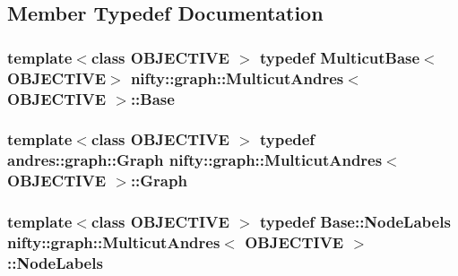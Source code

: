 \subsection{Member Typedef Documentation}
\hypertarget{classnifty_1_1graph_1_1MulticutAndres_a69c11222fd83a2839aad9a67ced87c87}{}
\subsubsection[{Base}]{\setlength{\rightskip}{0pt plus 5cm}template$<$class O\+B\+J\+E\+C\+T\+I\+V\+E $>$ typedef {\bf Multicut\+Base}$<$O\+B\+J\+E\+C\+T\+I\+V\+E$>$ {\bf nifty\+::graph\+::\+Multicut\+Andres}$<$ O\+B\+J\+E\+C\+T\+I\+V\+E $>$\+::{\bf Base}}\label{classnifty_1_1graph_1_1MulticutAndres_a69c11222fd83a2839aad9a67ced87c87}
\hypertarget{classnifty_1_1graph_1_1MulticutAndres_ac0ad695f55ab8ac75ab5f8be6f513652}{}
\subsubsection[{Graph}]{\setlength{\rightskip}{0pt plus 5cm}template$<$class O\+B\+J\+E\+C\+T\+I\+V\+E $>$ typedef andres\+::graph\+::\+Graph {\bf nifty\+::graph\+::\+Multicut\+Andres}$<$ O\+B\+J\+E\+C\+T\+I\+V\+E $>$\+::{\bf Graph}}\label{classnifty_1_1graph_1_1MulticutAndres_ac0ad695f55ab8ac75ab5f8be6f513652}
\hypertarget{classnifty_1_1graph_1_1MulticutAndres_a0948881682fa859a4f2b985e0a95b2c7}{}
\subsubsection[{Node\+Labels}]{\setlength{\rightskip}{0pt plus 5cm}template$<$class O\+B\+J\+E\+C\+T\+I\+V\+E $>$ typedef {\bf Base\+::\+Node\+Labels} {\bf nifty\+::graph\+::\+Multicut\+Andres}$<$ O\+B\+J\+E\+C\+T\+I\+V\+E $>$\+::{\bf Node\+Labels}}\label{classnifty_1_1graph_1_1MulticutAndres_a0948881682fa859a4f2b985e0a95b2c7}
\hypertarget{classnifty_1_1graph_1_1MulticutAndres_af65f82c6d6f78356d08de6728618fc02}{}
